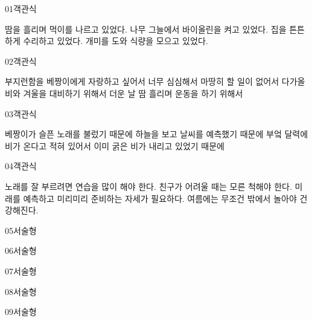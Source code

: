 \documentclass[fs11,seriesFre]{korfarm-base}
\begin{document}
\begin{kfQBlock}{01}{객관식}
\begin{kfChoices}
\kfChoice 땀을 흘리며 먹이를 나르고 있었다.
\kfChoice 나무 그늘에서 바이올린을 켜고 있었다.
\kfChoice 집을 튼튼하게 수리하고 있었다.
\kfChoice 개미를 도와 식량을 모으고 있었다.
\end{kfChoices}
\end{kfQBlock}
\begin{kfQBlock}{02}{객관식}
\begin{kfChoices}
\kfChoice 부지런함을 베짱이에게 자랑하고 싶어서
\kfChoice 너무 심심해서 마땅히 할 일이 없어서
\kfChoice 다가올 비와 겨울을 대비하기 위해서
\kfChoice 더운 날 땀 흘리며 운동을 하기 위해서
\end{kfChoices}
\end{kfQBlock}
\begin{kfQBlock}{03}{객관식}
\begin{kfChoices}
\kfChoice 베짱이가 슬픈 노래를 불렀기 때문에
\kfChoice 하늘을 보고 날씨를 예측했기 때문에
\kfChoice 부엌 달력에 비가 온다고 적혀 있어서
\kfChoice 이미 굵은 비가 내리고 있었기 때문에
\end{kfChoices}
\end{kfQBlock}
\begin{kfQBlock}{04}{객관식}
\begin{kfChoices}
\kfChoice 노래를 잘 부르려면 연습을 많이 해야 한다.
\kfChoice 친구가 어려울 때는 모른 척해야 한다.
\kfChoice 미래를 예측하고 미리미리 준비하는 자세가 필요하다.
\kfChoice 여름에는 무조건 밖에서 놀아야 건강해진다.
\end{kfChoices}
\end{kfQBlock}
\begin{kfQBlock}{05}{서술형}
\end{kfQBlock}
\begin{kfQBlock}{06}{서술형}
\end{kfQBlock}
\begin{kfQBlock}{07}{서술형}
\end{kfQBlock}
\begin{kfQBlock}{08}{서술형}
\end{kfQBlock}
\begin{kfQBlock}{09}{서술형}
\end{kfQBlock}
\end{document}
